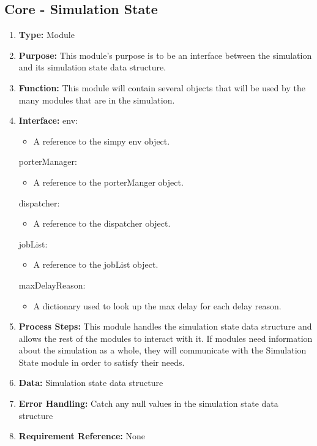 \documentclass[paper=letter, fontsize=10pt]{scrartcl}
\numberwithin{equation}{section}		%
\numberwithin{figure}{section}			%
\numberwithin{table}{section}				%
\begin{document}
\subsection{Core - Simulation State}
\begin{enumerate}[]
	\item \textbf{Type:} Module
	\item \textbf{Purpose:} This module's purpose is to be an interface between the simulation and its simulation state data structure.
	\item \textbf{Function:} This module will contain several objects that will be used by the many modules that are in the simulation.
	\item \textbf{Interface:}\newline
	env:
		\begin{itemize}
			\item A reference to the simpy env object.
		\end{itemize}
	porterManager:
		\begin{itemize}
			\item A reference to the porterManger object.
		\end{itemize}
	dispatcher:
		\begin{itemize}
			\item A reference to the dispatcher object.
		\end{itemize}
	jobList:
		\begin{itemize}
			\item A reference to the jobList object.
		\end{itemize}
	maxDelayReason:
		\begin{itemize}
			\item A dictionary used to look up the max delay for each delay reason.
		\end{itemize}	
	\item \textbf{Process Steps:} This module handles the simulation state data structure and allows the rest of the modules to interact with it.  If modules need information about the simulation as a whole, they will communicate with the Simulation State module in order to satisfy their needs. 
	\item \textbf{Data:} Simulation state data structure
	\item \textbf{Error Handling:} Catch any null values in the simulation state data structure
	\item \textbf{Requirement Reference:} None
\end{enumerate}
\end{document}
